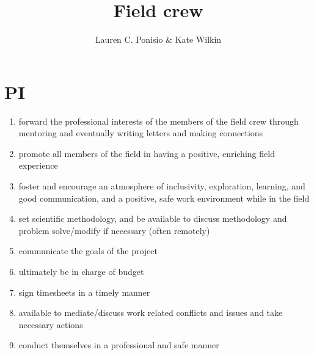 \documentclass[12pt]{article}
\title{Field crew}
\author{Lauren C. Ponisio \& Kate Wilkin}
\begin{document}
\maketitle

\section{PI}
\begin{enumerate} 
\item forward the professional interests of the members of the field
  crew through mentoring and eventually writing letters and making
  connections 
\item promote all members of the field in having a positive, enriching
  field experience
\item foster and encourage an atmosphere of inclusivity, exploration,
  learning, and good communication, and a positive, safe work
  environment while in the field
\item set scientific methodology, and be available to discuss
  methodology and problem solve/modify if necessary (often remotely)
\item communicate the goals of the project
\item ultimately be in charge of budget
\item sign timesheets in a timely manner 
\item available to mediate/discuss work related conflicts and issues
  and take necessary actions
\item conduct themselves in a professional and safe manner
\end{enumerate}
\end{document}

